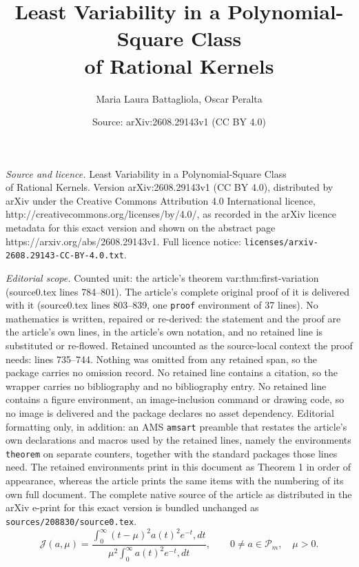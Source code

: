 \documentclass[10pt,a4paper]{amsart}
\title{Least Variability in a Polynomial-Square Class\\ of Rational Kernels}
\author{Maria Laura Battagliola, Oscar Peralta}
\date{Source: arXiv:2608.29143v1 (CC BY 4.0)}
\newcommand{\Pcal}{\mathcal P}
\begin{document}
\maketitle

\noindent\emph{Source and licence.} Least Variability in a Polynomial-Square Class\\ of Rational Kernels. Version arXiv:2608.29143v1 (CC BY 4.0), distributed by arXiv under the Creative Commons Attribution 4.0 International licence, http://creativecommons.org/licenses/by/4.0/, as recorded in the arXiv licence metadata for this exact version and shown on the abstract page https://arxiv.org/abs/2608.29143v1. Full licence notice: \texttt{licenses/arxiv-2608.29143-CC-BY-4.0.txt}.\par\smallskip

\noindent\textit{Editorial scope.} Counted unit: the article's theorem var:thm:first-variation (source0.tex lines 784--801). The article's complete original proof of it is delivered with it (source0.tex lines 803--839, one \texttt{proof} environment of 37 lines). No mathematics is written, repaired or re-derived: the statement and the proof are the article's own lines, in the article's own notation, and no retained line is substituted or re-flowed.  Retained uncounted as the source-local context the proof needs: lines 735--744.  Nothing was omitted from any retained span, so the package carries no omission record.  No retained line contains a citation, so the wrapper carries no bibliography and no bibliography entry.  No retained line contains a figure environment, an image-inclusion command or drawing code, so no image is delivered and the package declares no asset dependency.  Editorial formatting only, in addition: an AMS \texttt{amsart} preamble that restates the article's own declarations and macros used by the retained lines, namely the environments \texttt{theorem} on separate counters, together with the standard packages those lines need.  The retained environments print in this document as Theorem 1 in order of appearance, whereas the article prints the same items with the numbering of its own full document.  The complete native source of the article as distributed in the arXiv e-print for this exact version is bundled unchanged as \texttt{sources/208830/source0.tex}.
\begin{equation}\label{var:eq:J-def}
\mathcal J(a,\mu) =
\frac{
\displaystyle\int_0^\infty (t-\mu)^2a(t)^2e^{-t},dt
}{
\displaystyle\mu^2\int_0^\infty a(t)^2e^{-t},dt
},
\qquad
0\ne a\in\Pcal_m,\quad \mu>0.
\end{equation}
\end{document}
